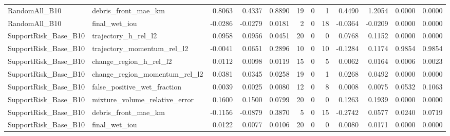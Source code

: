 \begin{tabular}{llrrrrrrrrrr}
RandomAll\_B10 & debris\_front\_mae\_km & 0.8063 & 0.4337 & 0.8890 & 19 & 0 & 1 & 0.4490 & 1.2054 & 0.0000 & 0.0000 \\
RandomAll\_B10 & final\_wet\_iou & -0.0286 & -0.0279 & 0.0181 & 2 & 0 & 18 & -0.0364 & -0.0209 & 0.0000 & 0.0000 \\
SupportRisk\_Base\_B10 & trajectory\_h\_rel\_l2 & 0.0958 & 0.0956 & 0.0451 & 20 & 0 & 0 & 0.0768 & 0.1152 & 0.0000 & 0.0000 \\
SupportRisk\_Base\_B10 & trajectory\_momentum\_rel\_l2 & -0.0041 & 0.0651 & 0.2896 & 10 & 0 & 10 & -0.1284 & 0.1174 & 0.9854 & 0.9854 \\
SupportRisk\_Base\_B10 & change\_region\_h\_rel\_l2 & 0.0112 & 0.0098 & 0.0119 & 15 & 0 & 5 & 0.0062 & 0.0164 & 0.0006 & 0.0023 \\
SupportRisk\_Base\_B10 & change\_region\_momentum\_rel\_l2 & 0.0381 & 0.0345 & 0.0258 & 19 & 0 & 1 & 0.0268 & 0.0492 & 0.0000 & 0.0000 \\
SupportRisk\_Base\_B10 & false\_positive\_wet\_fraction & 0.0039 & 0.0025 & 0.0080 & 12 & 0 & 8 & 0.0008 & 0.0075 & 0.0532 & 0.1063 \\
SupportRisk\_Base\_B10 & mixture\_volume\_relative\_error & 0.1600 & 0.1500 & 0.0799 & 20 & 0 & 0 & 0.1263 & 0.1939 & 0.0000 & 0.0000 \\
SupportRisk\_Base\_B10 & debris\_front\_mae\_km & -0.1156 & -0.0879 & 0.3870 & 5 & 0 & 15 & -0.2742 & 0.0577 & 0.0240 & 0.0719 \\
SupportRisk\_Base\_B10 & final\_wet\_iou & 0.0122 & 0.0077 & 0.0106 & 20 & 0 & 0 & 0.0080 & 0.0171 & 0.0000 & 0.0000 \\
\bottomrule
\end{tabular}
